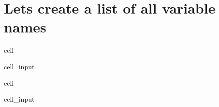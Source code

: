 \documentclass[letterpaper,10pt,english]{jupyterBook}
\begin{document}
\section{Lets create a list of all variable names}
\label{\detokenize{content/howto/onboard/eviews/onboard many models from wf1:lets-create-a-list-of-all-variable-names}}
\begin{sphinxuseclass}{cell}\begin{sphinxVerbatimInput}

\begin{sphinxuseclass}{cell_input}
\begin{sphinxVerbatim}[commandchars=\\\{\}]
  \PYG{p}{[}         \PYG{p}{]}
\end{sphinxVerbatim}

\end{sphinxuseclass}\end{sphinxVerbatimInput}

\end{sphinxuseclass}
\begin{sphinxuseclass}{cell}\begin{sphinxVerbatimInput}

\begin{sphinxuseclass}{cell_input}
\begin{sphinxVerbatim}[commandchars=\\\{\}]
  \PYG{p}{[}    \PYG{p}{[}\PYG{p}{]}    \PYG{p}{]}
\end{sphinxVerbatim}

\end{sphinxuseclass}\end{sphinxVerbatimInput}

\end{sphinxuseclass}
\end{document}
